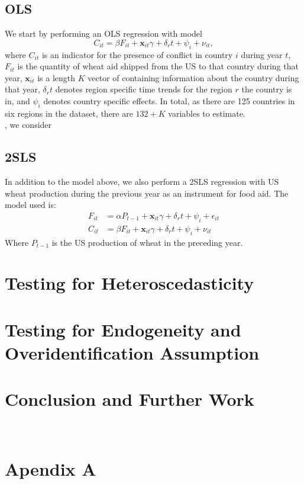 \documentclass{article}
\newcommand{\x}{\mathbf x}
\begin{document}
\subsection{OLS}
We start by performing an OLS regression with model
\[C_{it} = \beta F_{it} + \x_{it} \gamma +  \delta_r t + \psi_{i} + \nu_{it}, \]
where $C_{it}$ is an indicator for the presence of conflict in country $i$ during year $t$, $F_{it}$ is the quantity of wheat aid shipped from the US to that country during that year, $\x_{it}$ is a length $K$ vector of containing information about the country during that year, $\delta_r t$ denotes region specific time trends for the region $r$ the country is in, and $\psi_{i}$ denotes country specific effects. In total, as there are 125 countries in six regions in the dataset, there are $132+K$ variables to estimate. \\

, we consider 
\subsection{2SLS }
In addition to the model above, we also perform a 2SLS regression with US wheat production during the previous year as an instrument for food aid. The model used is:
\begin{align*}
F_{it} &= \alpha P_{t-1} +  \x_{it} \gamma +  \delta_r t + \psi_{i} + \epsilon_{it}\\
C_{it} &= \beta  F_{it} + \x_{it} \gamma +  \delta_r t + \psi_{i} + \nu_{it}
\end{align*}
Where $P_{t-1}$ is the US production of wheat in the preceding year. 
\section{Testing for Heteroscedasticity}
\section{Testing for Endogeneity and Overidentification Assumption}
\section{Conclusion and Further Work}

\section*{\\Apendix A}
\end{document}
